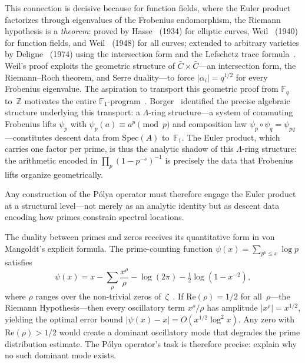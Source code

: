 This connection is decisive because for function fields, where the
Euler product factorizes through eigenvalues of the Frobenius
endomorphism, the Riemann hypothesis is a \emph{theorem}: proved by
Hasse~\cite{hasse34} (1934) for elliptic curves, Weil~\cite{weil40} (1940) for function fields, and Weil~\cite{weil48} (1948) for all curves; extended to arbitrary varieties by
Deligne~\cite{deligne74} (1974) using the intersection form and the Lefschetz trace
formula~\cite{milne15}.  Weil's proof exploits the geometric
structure of $\bar{C}\times\bar{C}$---an intersection form, the
Riemann--Roch theorem, and Serre duality---to force
$|\alpha_i| = q^{1/2}$ for every Frobenius eigenvalue.
The aspiration to transport this geometric proof from
$\mathbb{F}_q$ to~$\mathbb{Z}$ motivates the entire
$\mathbb{F}_1$-program~\cite{soule03,connes08,lopezpena09mapping}.
Borger~\cite{borger09} identified the precise algebraic structure
underlying this transport: a $\Lambda$-ring structure---a system of
commuting Frobenius lifts $\psi_p$ with $\psi_p(a) \equiv a^p
\pmod{p}$ and composition law $\psi_p\circ\psi_q = \psi_{pq}$---constitutes
descent data from $\mathrm{Spec}(A)$ to~$\mathbb{F}_1$.  The Euler
product, which carries one factor per prime, is thus the analytic
shadow of this $\Lambda$-ring structure: the arithmetic encoded in
$\prod_p(1-p^{-s})^{-1}$ is precisely the data that Frobenius
lifts organize geometrically.

Any construction of the P\'olya operator must therefore engage the
Euler product at a structural level---not merely as an analytic
identity but as descent data encoding how primes constrain spectral
locations.

\medskip

The duality between primes and zeros receives its quantitative form in
von Mangoldt's explicit formula.  The prime-counting function
$\psi(x) = \sum_{p^k\le x}\!\log p$ satisfies
\begin{equation}\label{eq:explicit-formula}
  \psi(x) = x - \sum_\rho \frac{x^\rho}{\rho}
    - \log(2\pi) - \tfrac{1}{2}\log(1-x^{-2}),
\end{equation}
where $\rho$ ranges over the non-trivial zeros
of~$\zeta$~\cite{titchmarsh86}.  If
$\mathrm{Re}(\rho)=1/2$ for all~$\rho$---the Riemann
Hypothesis---then every oscillatory term $x^\rho/\rho$ has amplitude
$|x^\rho| = x^{1/2}$, yielding the optimal error bound
$|\psi(x)-x| = O(x^{1/2}\log^2 x)$.  Any zero with
$\mathrm{Re}(\rho)>1/2$ would create a dominant oscillatory mode that
degrades the prime distribution estimate.  The P\'olya operator's task is
therefore precise: explain why no such dominant mode exists.

